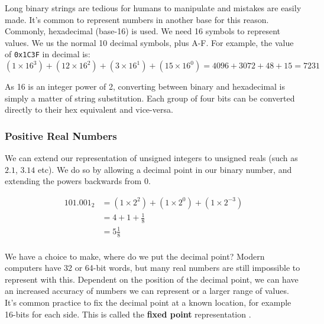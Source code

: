 \documentclass{article}
\begin{document}
	\par 
	Long binary strings are tedious for humans to manipulate and mistakes are easily made. It's common to represent numbers in another base for this reason. Commonly, hexadecimal (base-16) is used. We need 16 symbols to represent values. We us the normal 10 decimal symbols, plus A-F. For example, the value of \texttt{0x1C3F} in decimal is:
	\[ (1 \times 16^{3}) + (12 \times 16^{2}) + (3 \times 16^{1}) + (15 \times 16^{0}) = 4096 + 3072 + 48 + 15 = 7231 \]
	
	As 16 is an integer power of 2, converting between binary and hexadecimal is simply a matter of string substitution. Each group of four bits can be converted directly to their hex equivalent and vice-versa.
	
	\subsubsection{Positive Real Numbers}
	We can extend our representation of unsigned integers to unsigned reals (such as $2.1$, $3.14$ etc). We do so by allowing a decimal point in our binary number, and extending the powers backwards from 0. 
	
	\begin{align*}
	101.001_{2} &= (1 \times 2^{2}) + (1 \times 2^{0}) + (1 \times 2^{-3}) \\
				&= 4 + 1 + \frac{1}{8}									   \\
				&= 5\frac{1}{8}                                            \\
	\end{align*}		
	
	We have a choice to make, where do we put the decimal point? Modern computers have 32 or 64-bit words, but many real numbers are still impossible to represent with this. Dependent on the position of the decimal point, we can have an increased accuracy of numbers we can represent or a larger range of values. It's common practice to fix the decimal point at a known location, for example 16-bits for each side. This is called the \textbf{fixed point} representation .
	
\end{document}
